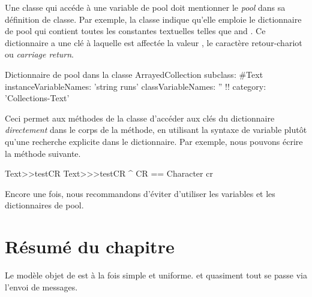 \documentclass[a4paper,10pt,twoside]{book}
\begin{document}
Une classe qui accéde à une variable de pool doit mentionner le \emph{pool}
dans sa définition de classe.
Par exemple, la classe  indique qu'elle emploie le dictionnaire
de pool  qui contient toutes les constantes textuelles
telles que 
 and . 
Ce dictionnaire a une clé  à laquelle est affectée la valeur
, \ie le caractère retour-chariot ou \emph{carriage return}.

\begin{classdef}[textpooldict]{Dictionnaire de pool dans la classe }
ArrayedCollection subclass: #Text
        instanceVariableNames: 'string runs' 	
        classVariableNames: '' 	
        !!
        category: 'Collections-Text'
\end{classdef}
   
Ceci permet aux méthodes de la classe  d'accéder aux clés
du dictionnaire \emph{directement} dans le corps de la méthode, \ie 
en utilisant la syntaxe de variable plutôt qu'une recherche explicite
dans le dictionnaire.
Par exemple, nous pouvons écrire la méthode suivante.
  
\begin{method}[texttestcr]{Text>>testCR}
Text>>>testCR 	
      ^ CR == Character cr
\end{method}

Encore une fois, nous recommandons d'éviter d'utiliser
les variables et les dictionnaires de pool.

\section{Résumé du chapitre}

Le modèle objet de \pharo est à la fois simple et uniforme.
\Mantra et quasiment tout se passe via l'envoi de messages. %
\end{document}
